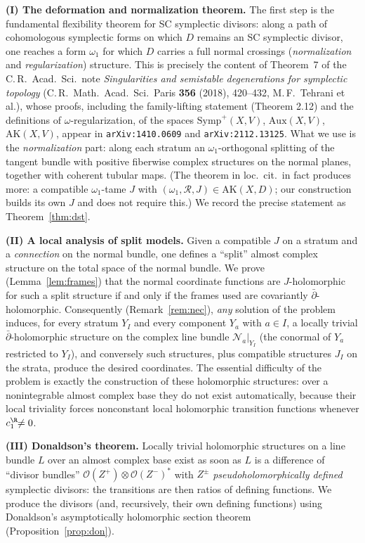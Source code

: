 \documentclass[11pt]{amsart}
\theoremstyle{plain}
\theoremstyle{definition}
\newcommand{\Symp}{\mathrm{Symp}}
\newcommand{\AK}{\mathrm{AK}}
\newcommand{\NN}{\mathcal{N}}
\newcommand{\cO}{\mathcal{O}}
\begin{document}
\smallskip
\noindent\textbf{(I) The deformation and normalization theorem.} The first
step is the fundamental flexibility theorem for SC symplectic divisors: along
a path of cohomologous symplectic forms on which $D$ remains an SC symplectic
divisor, one reaches a form $\omega_1$ for which $D$ carries a full
normal crossings (\emph{normalization} and \emph{regularization}) structure.
This is precisely the content of Theorem~7 of the C.\,R.\ Acad.\ Sci.\ note
\emph{Singularities and semistable degenerations for symplectic topology}
(C.\,R.\ Math.\ Acad.\ Sci.\ Paris \textbf{356} (2018), 420--432,
M.\,F.\ Tehrani et al.), whose proofs, including the family-lifting statement
(Theorem 2.12) and the definitions of $\omega$-regularization, of the spaces
$\Symp^+(X,V)$, $\mathrm{Aux}(X,V)$, $\AK(X,V)$, appear in
\texttt{arXiv:1410.0609} and \texttt{arXiv:2112.13125}. What we use is the
\emph{normalization} part: along each stratum an $\omega_1$-orthogonal
splitting of the tangent bundle with positive fiberwise complex structures on
the normal planes, together with coherent tubular maps. (The theorem in loc.\
cit.\ in fact produces more: a compatible $\omega_1$-tame $J$ with
$(\omega_1,\mathcal R,J)\in\AK(X,D)$; our construction builds its own $J$ and
does not require this.) We record the precise statement as
Theorem~\ref{thm:dst}.

\smallskip
\noindent\textbf{(II) A local analysis of split models.} Given a compatible
$J$ on a stratum and a \emph{connection} on the normal bundle, one defines a
``split'' almost complex structure on the total space of the normal bundle.
We prove (Lemma~\ref{lem:frames}) that the normal coordinate functions are
$J$-holomorphic for such a split structure if and only if the frames used are
covariantly $\bar\partial$-holomorphic. Consequently (Remark~\ref{rem:nec}),
\emph{any} solution of the problem induces, for every stratum $Y_I$ and every
component $Y_a$ with $a\in I$, a locally trivial
$\bar\partial$-holomorphic structure on the complex line bundle
$\NN_a|_{Y_I}$ (the conormal of $Y_a$ restricted to $Y_I$), and conversely
such structures, plus compatible structures $J_I$ on the strata, produce the
desired coordinates. The essential difficulty of the problem is exactly the
construction of these holomorphic structures: over a nonintegrable almost
complex base they do not exist automatically, because their local
triviality forces nonconstant local holomorphic transition functions whenever
$c_1^{\R}\!\!\neq 0$.

\smallskip
\noindent\textbf{(III) Donaldson's theorem.} Locally trivial holomorphic
structures on a line bundle $L$ over an almost complex base exist as soon as
$L$ is a difference of ``divisor bundles'' $\cO(Z^+)\otimes\cO(Z^-)^*$ with
$Z^\pm$ \emph{pseudoholomorphically defined} symplectic divisors: the
transitions are then ratios of defining functions. We produce the divisors
(and, recursively, their own defining functions) using
Donaldson's asymptotically holomorphic section theorem
(Proposition~\ref{prop:don}).
\end{document}
